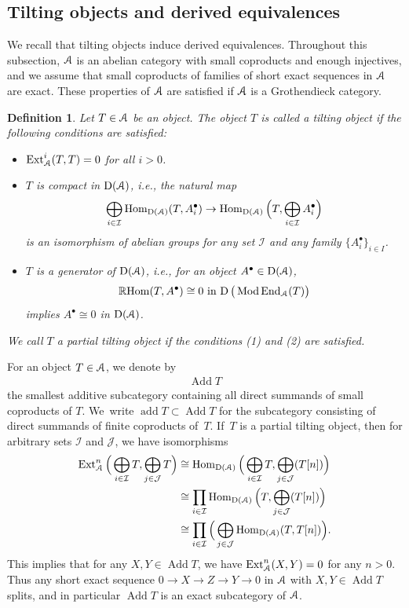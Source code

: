 \documentclass[pdftex]{sigma}%
\newtheorem{dfn}{Definition}[section]
\numberwithin{equation}{section}
\newcommand{\Hom}{\operatorname{Hom}}
\newcommand{\Ext}{\operatorname{Ext}}
\newcommand{\RHom}{\operatorname{{\mathbb R}Hom}}
\newcommand{\End}{\operatorname{End}}
\newcommand{\Mod}{\operatorname{Mod}}
\newcommand{\add}{\operatorname{add}}
\newcommand{\Add}{\operatorname{Add}}
\newcommand{\D}{\operatorname{D}}
\newcommand{\cI}{\mathcal{I}}
\newcommand{\cJ}{\mathcal{J}}
\newcommand{\scrA}{\EuScript{A}}
\begin{document}
\subsection{Tilting objects and derived equivalences}

We recall that tilting objects induce derived equivalences.
Throughout this subsection, $\scrA$ is an abelian category with small coproducts and enough injectives, and we assume that small coproducts of families of short exact sequences in $\scrA$ are exact. These properties of $\scrA$ are satisfied if $\scrA$ is a Grothendieck category.

\begin{dfn} Let $T\in \scrA$ be an object. The object $T$ is called a {\it tilting object} if the following conditions are satisfied:
\begin{itemize}\itemsep=0pt
\item[$1.$] $\Ext_{\scrA}^i(T,T)=0$ for all $i>0$.

\item[$2.$] $T$ is {\it compact} in $\D(\scrA)$, i.e., the natural map
\begin{gather*}
\bigoplus_{i\in \cI}\Hom_{\D(\scrA)}(T,A_i^{\bullet})\to\Hom_{\D(\scrA)}\Big(T,\bigoplus_{i\in\cI}A_i^{\bullet}\Big)
\end{gather*}
is an isomorphism of abelian groups for any set $\cI$ and any family $\{A_i^{\bullet}\}_{i\in I}$.

\item[$3.$] $T$ is a {\it generator} of $\D(\scrA)$, i.e., for an object $A^{\bullet}\in \D(\scrA)$, \[\RHom(T,A^{\bullet})\cong0$ in $\D\big(\Mod\End_{\scrA}(T)\big)\] implies $A^{\bullet}\cong0$ in $\D(\scrA)$.
\end{itemize}
We call $T$ a {\it partial tilting object} if the conditions (1) and (2) are satisfied.
\end{dfn}

For an object $T\in \scrA$, we denote by
\begin{gather*}
\Add T
\end{gather*}
the smallest additive subcategory containing all direct summands of small coproducts of $T$. We~write $\add T\subset \Add T$ for the subcategory consisting of direct summands of finite coproducts of~$T$. If~$T$ is a partial tilting object, then for arbitrary sets $\cI$ and $\cJ$, we have isomorphisms
\begin{align*}
\Ext^n_{\scrA}\Big(\bigoplus_{i\in \cI}T,\bigoplus_{j\in \cJ}T\Big) &\cong\Hom_{\D(\scrA)}\Big(\bigoplus_{i\in \cI}T,\bigoplus_{j\in \cJ}(T[n])\Big)
\\
&\cong \prod_{i\in \cI}\Hom_{\D(\scrA)}\Big(T,\bigoplus_{j\in \cJ}(T[n])\Big)
\\
&\cong \prod_{i\in\cI}\Big(\bigoplus_{j\in\cJ}\Hom_{\D(\scrA)}(T,T[n])\Big).
\end{align*}
This implies that for any $X,Y\in \Add T$, we have $\Ext_{\scrA}^n(X,Y)=0$ for any $n>0$. Thus any short exact sequence $0\to X\to Z\to Y\to0$ in $\scrA$ with $X,Y\in \Add T$ splits, and in particular $\Add T$ is an exact subcategory of $\scrA$.
\end{document}
